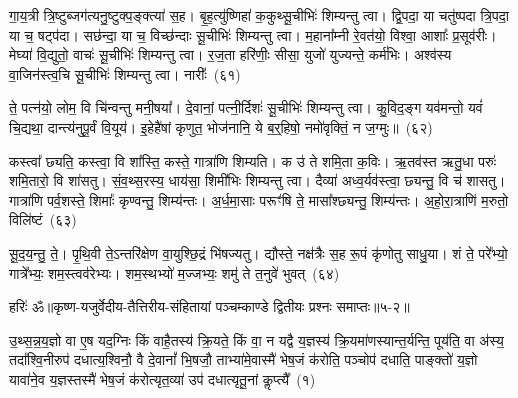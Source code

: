 {\anuvakamend[{प॒श्चादे॒ताः पु॒रो᳚\-ऽक्ष्ण॒या कल्प॒ते\-ऽसं॑ यतं॒ पञ्च॑त्रिꣳशच्च}]}%

गा॒य॒त्री त्रि॒ष्टुब्जग॑त्यनु॒ष्टुक्प॒ङ्क्त्या॑ स॒ह। बृ॒ह॒त्यु॑ष्णिहा॑ क॒कुथ्सू॒चीभिः॑ शिम्यन्तु त्वा। द्वि॒पदा॒ या चतु॑ष्पदा त्रि॒पदा॒ या च॒ षट्प॑दा। सछ॑न्दा॒ या च॒ विच्छ॑न्दाः सू॒चीभिः॑ शिम्यन्तु त्वा। म॒हाना᳚म्नी रे॒वत॑यो॒ विश्वा॒ आशाः᳚ प्र॒सूव॑रीः। मेघ्या॑ वि॒द्युतो॒ वाचः॑ सू॒चीभिः॑ शिम्यन्तु त्वा। र॒ज॒ता हरि॑णीः॒ सीसा॒ युजो॑ युज्यन्ते॒ कर्म॑भिः। अश्व॑स्य वा॒जिन॑स्त्व॒चि सू॒चीभिः॑ शिम्यन्तु त्वा। नारीः᳚~(६१)

ते॒ पत्न॑यो॒ लोम॒ वि चि॑न्वन्तु मनी॒षया᳚। दे॒वानां॒ पत्नी॒र्दिशः॑ सू॒चीभिः॑ शिम्यन्तु त्वा। कु॒विद॒ङ्ग यव॑मन्तो॒ यवं॑ चि॒द्यथा॒ दान्त्य॑नुपू॒र्वं वि॒यूय॑। इ॒हेहै॑षां कृणुत॒ भोज॑नानि॒ ये ब॒र्॒\mbox{}हिषो॒ नमो॑वृक्तिं॒ न ज॒ग्मुः॥~(६२)

{\anuvakamend[{नारी᳚स्त्रि॒ꣳ॒शच्च॑}]}%

कस्त्वा᳚ छ्यति॒ कस्त्वा॒ वि शा᳚स्ति॒ कस्ते॒ गात्रा॑णि शिम्यति। क उ॑ ते शमि॒ता क॒विः। ऋ॒तव॑स्त ऋतु॒धा परुः॑ शमि॒तारो॒ वि शा॑सतु। सं॒व॒थ्स॒रस्य॒ धाय॑सा॒ शिमी॑भिः शिम्यन्तु त्वा। दैव्या॑ अध्व॒र्यव॑स्त्वा॒ छ्यन्तु॒ वि च॑ शासतु। गात्रा॑णि पर्व॒शस्ते॒ शिमाः᳚ कृण्वन्तु॒ शिम्य॑न्तः। अ॒र्ध॒मा॒साः परूꣳ॑षि ते॒ मासा᳚श्छ्यन्तु॒ शिम्य॑न्तः। अ॒हो॒रा॒त्राणि॑ म॒रुतो॒ विलि॑ष्टं~(६३)

सू॒द॒य॒न्तु॒ ते॒। पृ॒थि॒वी ते॒\-ऽन्तरि॑क्षेण वा॒युश्छि॒द्रं भि॑षज्यतु। द्यौस्ते॒ नक्ष॑त्रैः स॒ह रू॒पं कृ॑णोतु साधु॒या। शं ते॒ परे᳚भ्यो॒ गात्रे᳚भ्यः॒ शम॒स्त्वव॑रेभ्यः। शम॒स्थभ्यो॑ म॒ज्जभ्यः॒ शमु॑ ते त॒नुवे॑ भुवत्~(६४)

{\anuvakamend[{विलि॑ष्टन्त्रि॒ꣳ॒शच्च॑}]}%

{हरिः॑ ॐ}{॥कृष्ण-यजुर्वेदीय-तैत्तिरीय-संहितायां पञ्चम्काण्डे द्वितीयः प्रश्नः समाप्तः॥५-२॥}

\setcounter{anuvakam}{0}
उ॒थ्स॒न्न॒य॒ज्ञो वा ए॒ष यद॒ग्निः किं वाहै॒तस्य॑ क्रि॒यते॒ किं वा॒ न यद्वै य॒ज्ञस्य॑ क्रि॒यमा॑णस्यान्त॒र्यन्ति॒ पूय॑ति॒ वा अ॑स्य॒ तदा᳚श्वि॒नीरुप॑ दधात्य॒श्विनौ॒ वै दे॒वानां᳚ भि॒षजौ॒ ताभ्या॑मे॒वास्मै॑ भेष॒जं क॑रोति॒ पञ्चोप॑ दधाति॒ पाङ्क्तो॑ य॒ज्ञो यावा॑ने॒व य॒ज्ञस्तस्मै॑ भेष॒जं क॑रोत्यृत॒व्या॑ उप॑ दधात्यृतू॒नां कॢप्त्यै᳚~(१)

